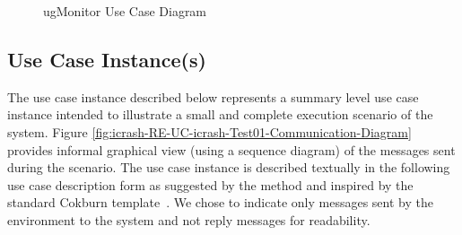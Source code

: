 \begin{figure}
\begin{center}
\end{center}
\caption{\msricrash ugMonitor Use Case Diagram}
\label{fig:icrash-UCM-icrash-ugMonitor}
\end{figure}  
\vspace{0.5cm}

\clearpage

\subsection{Use Case Instance(s)}

The use case instance described below represents a summary level use case instance intended to illustrate a small and complete execution scenario of the \msricrash system. Figure \ref{fig:icrash-RE-UC-icrash-Test01-Communication-Diagram} provides informal graphical view (using a sequence diagram) of the messages sent during the scenario. The use case instance is described textually in the following use case description form as suggested by the \msrmessir method and inspired by the standard Cokburn template~\cite{armour01usecase}. We chose to indicate only messages sent by the environment to the system and not reply messages for readability.


